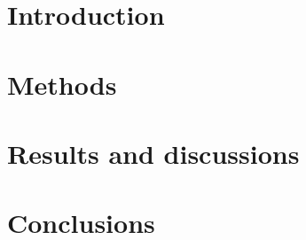 \documentclass{article}
\begin{document}
\section{Introduction}

\lipsum[1]\cite{jack1971,lieberman1989}

\lipsum[3]\cite{sander1969}

\section{Methods}

\lipsum[4]\cite{Powis2024,Sun2023a}

\section{Results and discussions}

\lipsum[1]\citep{Lopez2013, Falgout2002a}

\lipsum[3]\citep{Donko2021}

\section{Conclusions}

\lipsum[4]


\newpage



\end{document}
